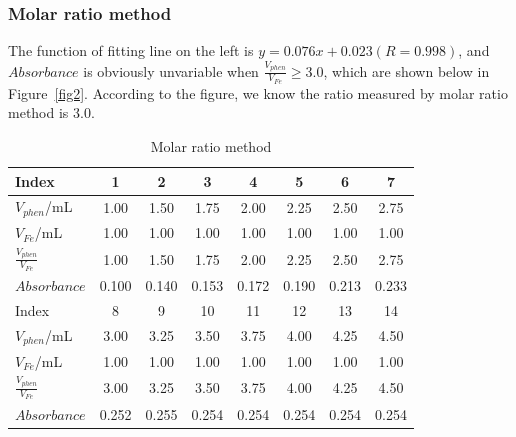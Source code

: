 \subsubsection{Molar ratio method}

The function of fitting line on the left is $y=0.076x+0.023(R=0.998)$, and $Absorbance$ is obviously unvariable when $\frac{V_{phen}}{V_{Fe}}\geq 3.0$, which are shown below in Figure~\ref{fig2}. According to the figure, we know the ratio measured by molar ratio method is $3.0$.

\begin{table}[H]
	\caption{Molar ratio method}
	\label{Tab.Mrm}
	\begin{tabular}{lccccccc}
	\toprule
	Index			&1		&2		&3		&4		&5		&6		&7		\\
	\midrule
	$V_{phen}$/mL	&1.00	&1.50	&1.75	&2.00	&2.25	&2.50	&2.75	\\
	$V_{Fe}$/mL		&1.00	&1.00	&1.00	&1.00	&1.00	&1.00	&1.00	\\
	$\frac{V_{phen}}{V_{Fe}}$
					&1.00	&1.50	&1.75	&2.00	&2.25	&2.50	&2.75	\\
	$Absorbance$	&0.100	&0.140	&0.153	&0.172	&0.190	&0.213	&0.233	\\
	\midrule
	Index			&8		&9		&10		&11		&12		&13		&14\\
	\midrule
	$V_{phen}$/mL	&3.00	&3.25	&3.50	&3.75	&4.00	&4.25	&4.50\\
	$V_{Fe}$/mL		&1.00	&1.00	&1.00	&1.00	&1.00	&1.00	&1.00\\
	$\frac{V_{phen}}{V_{Fe}}$
					&3.00	&3.25	&3.50	&3.75	&4.00	&4.25	&4.50\\
	$Absorbance$	&0.252	&0.255	&0.254	&0.254	&0.254	&0.254	&0.254\\
	\bottomrule
	\end{tabular}
\end{table}

